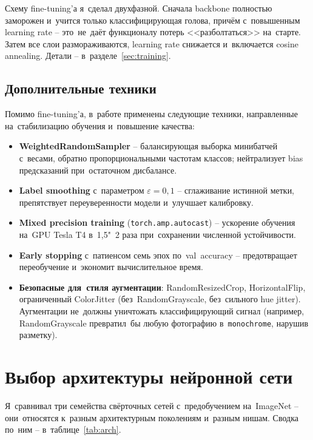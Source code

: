 \documentclass[a4paper,12pt]{diplom}
\begin{document}
Схему fine-tuning'а я~сделал двухфазной. Сначала backbone полностью заморожен и~учится только классифицирующая голова, причём с~повышенным learning rate -- это~не~даёт функционалу потерь <<разболтаться>> на~старте. Затем все слои размораживаются, learning rate снижается и~включается cosine annealing. Детали -- в~разделе~\ref{sec:training}.

\subsection{Дополнительные техники}

Помимо fine-tuning'а, в~работе применены следующие техники, направленные на~стабилизацию обучения и~повышение качества:
\begin{itemize}
\item \textbf{WeightedRandomSampler} -- балансирующая выборка минибатчей с~весами, обратно пропорциональными частотам классов; нейтрализует bias предсказаний при~остаточном дисбалансе.
\item \textbf{Label smoothing} с~параметром $\varepsilon=0{,}1$ -- сглаживание истинной метки, препятствует переуверенности модели и~улучшает калибровку.
\item \textbf{Mixed precision training} (\texttt{torch.amp.autocast}) -- ускорение обучения на~GPU Tesla T4 в~1{,}5"~2 раза при~сохранении численной устойчивости.
\item \textbf{Early stopping} с~патиенсом семь эпох по~val~accuracy -- предотвращает переобучение и~экономит вычислительное время.
\item \textbf{Безопасные для~стиля аугментации}: RandomResizedCrop, HorizontalFlip, ограниченный ColorJitter (без~RandomGrayscale, без~сильного hue jitter). Аугментации не~должны уничтожать классифицирующий сигнал (например, RandomGrayscale превратил~бы любую фотографию в~\texttt{monochrome}, нарушив разметку).
\end{itemize}

\section{Выбор архитектуры нейронной сети}
\label{sec:arch}

Я~сравнивал три семейства свёрточных сетей с~предобучением на~ImageNet -- они~относятся к~разным архитектурным поколениям и~разным нишам. Сводка по~ним -- в~таблице~\ref{tab:arch}.
\end{document}
